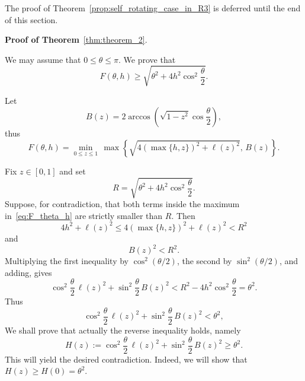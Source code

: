 \documentclass[a4paper,12pt,reqno]{amsart}
\begin{document}
The proof of Theorem~\ref{prop:self_rotating_case_in_R3} is deferred until the end of this section.

\smallskip
\noindent \textbf{Proof of Theorem}~\ref{thm:theorem_2}. 

We may assume that \(0\le \theta\le \pi\). 
We prove that
\[
F(\theta,h)\ge \sqrt{\theta^2+4h^2\cos^2\frac{\theta}{2}}.
\]



Let
\[
B(z)=2\arccos\left(\sqrt{1-z^2}\cos\frac{\theta}{2}\right),
\]
thus
\begin{equation}
\label{eq:F_theta_h}
F(\theta,h)=
\min_{0\le z\le 1}\,\max\left\{
\sqrt{4\left(\max\{h,z\}\right)^2+\ell(z)^2},
\,B(z)
\right\}.
\end{equation}

Fix \(z\in[0,1]\) and set
\[
R=\sqrt{\theta^2+4h^2\cos^2\frac{\theta}{2}}.
\]
Suppose, for contradiction, that both terms inside the maximum in~\eqref{eq:F_theta_h} are strictly smaller than \(R\). Then
\[
4h^2+\ell(z)^2 \le 4\left(\max\{h,z\}\right)^2+\ell(z)^2<R^2
\]
and
\[
B(z)^2<R^2.
\]
Multiplying the first inequality by \(\cos^2(\theta/2)\), the second by
\(\sin^2(\theta/2)\), and adding, gives
\[
\cos^2\frac{\theta}{2}\,\ell(z)^2
+
\sin^2\frac{\theta}{2}\,B(z)^2
<
R^2
-
4h^2\cos^2\frac{\theta}{2}=\theta^2.
\]
Thus
\begin{equation}
\label{eq:auxiliary_ineq_opposite}
\cos^2\frac{\theta}{2}\,\ell(z)^2
+
\sin^2\frac{\theta}{2}\,B(z)^2
<
\theta^2,
\end{equation}
We shall prove that actually the reverse inequality holds, namely
\begin{equation}
\label{eq:auxiliary_ineq}
H(z):=\cos^2\frac{\theta}{2}\,\ell(z)^2
+
\sin^2\frac{\theta}{2}\,B(z)^2
\ge \theta^2.
\end{equation}
This will yield the desired contradiction. Indeed, we will show that \(H(z)\ge H(0)=\theta^2\).
\end{document}
